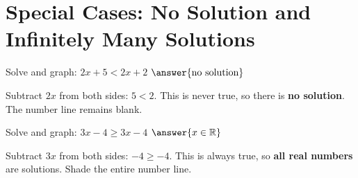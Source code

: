 \documentclass{ximera}
\begin{document}
\section*{Special Cases: No Solution and Infinitely Many Solutions}

\begin{problem}
Solve and graph: $2x + 5 < 2x + 2$ $\answer{\text{no solution}}$
\begin{feedback}
Subtract $2x$ from both sides: $5 < 2$. This is never true, so there is \textbf{no solution}. The number line remains blank.
\end{feedback}
\end{problem}

\begin{problem}
Solve and graph: $3x - 4 \geq 3x - 4$ $\answer{x \in \mathbb{R}}$
\begin{feedback}
Subtract $3x$ from both sides: $-4 \geq -4$. This is always true, so \textbf{all real numbers} are solutions. Shade the entire number line.
\end{feedback}
\end{problem}

\end{document}
